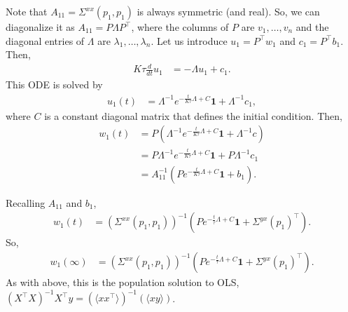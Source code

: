 \documentclass{article}
\begin{document}
Note that $A_{11} = \Sigma^{xx}(p_1, p_1)$ is always symmetric (and real).
So, we can diagonalize it as $A_{11} = P \Lambda P^\top$, where the columns of $P$ are $v_1, \ldots, v_n$ and the diagonal entries of $\Lambda$ are $\lambda_1, \ldots, \lambda_n$.
Let us introduce $u_1 = P^\top w_1$ and $c_1 = P^\top b_1$.
Then,
\begin{align}
  K \tau \frac{d}{dt} u_1 &= - \Lambda u_1 + c_1. \label{eq:grad_flow_exclusive_reparam}
\end{align}
This ODE is solved by
\begin{align}
  u_1(t) &= \Lambda^{-1} e^{ -\frac{t}{K \tau} \Lambda + C } \mathbf{1} + \Lambda^{-1} c_1,
\end{align}
where $C$ is a constant diagonal matrix that defines the initial condition.
Then,
\begin{align}
  w_1(t) &= P \left( \Lambda^{-1} e^{ -\frac{t}{K \tau} \Lambda + C } \mathbf{1} + \Lambda^{-1} c \right) \\
  &= P \Lambda^{-1} e^{ -\frac{t}{K \tau} \Lambda + C } \mathbf{1} + P \Lambda^{-1} c_1 \\
  &= A_{11}^{-1} \left( P e^{ -\frac{t}{K \tau} \Lambda + C } \mathbf{1} + b_1 \right).
\end{align}

Recalling $A_{11}$ and $b_1$,
\begin{align}
  w_1(t) &= ( \Sigma^{xx}(p_1,p_1) )^{-1} \left( P e^{ -\frac{t}{\tau} \Lambda + C } \mathbf{1} + \Sigma^{yx}(p_1)^\top \right).
\end{align}
So,
\begin{align}
  w_1(\infty) &= ( \Sigma^{xx}(p_1,p_1) )^{-1} \left( P e^{ -\frac{t}{\tau} \Lambda + C } \mathbf{1} + \Sigma^{yx}(p_1)^\top \right).
\end{align}
As with above, this is the population solution to OLS, $(X^\top X)^{-1} X^\top y = ( \langle x x^\top \rangle )^{-1} ( \langle x y \rangle )$.
\end{document}
